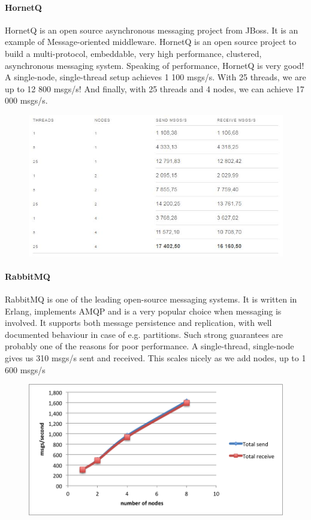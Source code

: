 \paragraph{HornetQ}
\label{sec:sec01}
HornetQ is an open source asynchronous messaging project from JBoss. 
It is an example of Message-oriented middleware.
 HornetQ is an open source project to build a multi-protocol, embeddable, very high performance, clustered,
  asynchronous messaging system.
Speaking of performance, HornetQ is very good! A single-node, 
single-thread setup achieves 1 100 msgs/s. 
With 25 threads, we are up to 12 800 msgs/s! And finally, with 25 threads and 4 nodes, we can achieve 17 000 msgs/s.
 \begin{figure}[h!]
	\centering
	\includegraphics[height=0.3\textheight]{fig01/HornetQ}
	\label{fig:FilialesEtClients}
\end{figure}
\paragraph{RabbitMQ}
\label{sec:sec01}
RabbitMQ is one of the leading open-source messaging systems. 
It is written in Erlang, implements AMQP and is a very popular choice when messaging is involved. 
It supports both message persistence and replication, with well documented behaviour in case of e.g. partitions.
Such strong guarantees are probably one of the reasons for poor performance. 
A single-thread, single-node gives us 310 msgs/s sent and received. 
This scales nicely as we add nodes, up to 1 600 msgs/s
 \begin{figure}[h!]
	\centering
	\includegraphics[height=0.3\textheight]{fig01/RabbitMQ}
	\label{fig:FilialesEtClients}
\end{figure}


